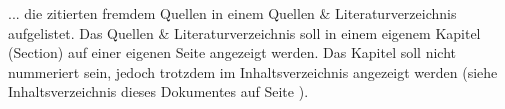 
... die zitierten fremdem Quellen in einem Quellen \& Literaturverzeichnis aufgelistet. Das Quellen \& Literaturverzeichnis soll in einem eigenem Kapitel (Section) auf einer eigenen Seite angezeigt werden. Das Kapitel soll nicht nummeriert sein, jedoch trotzdem im Inhaltsverzeichnis angezeigt werden (siehe Inhaltsverzeichnis dieses Dokumentes auf Seite \pageref{toc}).
